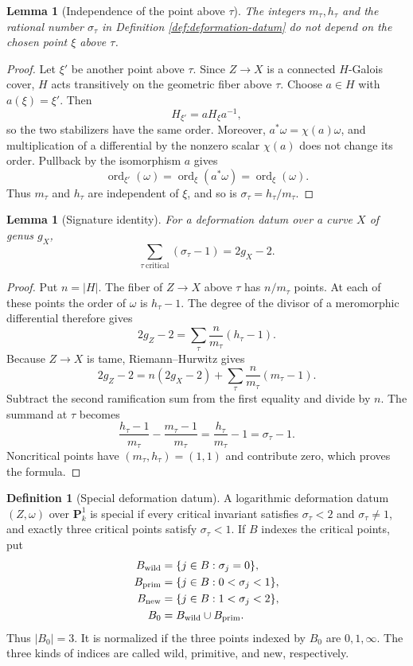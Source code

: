 \documentclass[11pt]{amsart}
\theoremstyle{plain}
\newtheorem{lemma}[theorem]{Lemma}
\theoremstyle{definition}
\newtheorem{definition}[theorem]{Definition}
\numberwithin{equation}{section}
\begin{document}
\begin{lemma}[Independence of the point above $\tau$]
\label{lem:deformation-invariants}
The integers $m_\tau,h_\tau$ and the rational number $\sigma_\tau$ in
Definition \ref{def:deformation-datum} do not depend on the chosen point
$\xi$ above $\tau$.
\end{lemma}

\begin{proof}
Let $\xi'$ be another point above $\tau$.  Since $Z\to X$ is a connected
$H$-Galois cover, $H$ acts transitively on the geometric fiber above
$\tau$.  Choose $a\in H$ with $a(\xi)=\xi'$.  Then
\[
 H_{\xi'}=aH_\xi a^{-1},
\]
so the two stabilizers have the same order.  Moreover,
$a^*\omega=\chi(a)\omega$, and multiplication of a differential by the
nonzero scalar $\chi(a)$ does not change its order.  Pullback by the
isomorphism $a$ gives
\[
 \operatorname{ord}_{\xi'}(\omega)
 =\operatorname{ord}_{\xi}(a^*\omega)
 =\operatorname{ord}_{\xi}(\omega).
\]
Thus $m_\tau$ and $h_\tau$ are independent of $\xi$, and so is
$\sigma_\tau=h_\tau/m_\tau$.
\end{proof}

\begin{lemma}[Signature identity]\label{lem:signature-identity}
For a deformation datum over a curve $X$ of genus $g_X$,
\[
 \sum_{\tau\ \mathrm{critical}}(\sigma_\tau-1)=2g_X-2.
\]
\end{lemma}

\begin{proof}
Put $n=|H|$.  The fiber of $Z\to X$ above $\tau$ has $n/m_\tau$ points.
At each of these points the order of $\omega$ is $h_\tau-1$.  The degree of
the divisor of a meromorphic differential therefore gives
\[
 2g_Z-2=\sum_\tau\frac{n}{m_\tau}(h_\tau-1).
\]
Because $Z\to X$ is tame, Riemann--Hurwitz gives
\[
 2g_Z-2=n(2g_X-2)
 +\sum_\tau\frac{n}{m_\tau}(m_\tau-1).
\]
Subtract the second ramification sum from the first equality and divide by
$n$.  The summand at $\tau$ becomes
\[
 \frac{h_\tau-1}{m_\tau}-\frac{m_\tau-1}{m_\tau}
 =\frac{h_\tau}{m_\tau}-1=\sigma_\tau-1.
\]
Noncritical points have $(m_\tau,h_\tau)=(1,1)$ and contribute zero, which
proves the formula.
\end{proof}

\begin{definition}[Special deformation datum]\label{def:special-datum}
A logarithmic deformation datum $(Z,\omega)$ over $\mathbf P^1_k$ is
special if every critical invariant satisfies $\sigma_\tau<2$ and
$\sigma_\tau\ne1$, and exactly three critical points satisfy
$\sigma_\tau<1$.  If $B$ indexes the critical points, put
\[
 \begin{aligned}
 B_{\rm wild}&=\{j\in B:\sigma_j=0\},\\
 B_{\rm prim}&=\{j\in B:0<\sigma_j<1\},\\
 B_{\rm new}&=\{j\in B:1<\sigma_j<2\},\\
 B_0&=B_{\rm wild}\cup B_{\rm prim}.
 \end{aligned}
\]
Thus $|B_0|=3$.  It is normalized if the three points indexed by $B_0$ are
$0,1,\infty$.  The three kinds of indices are called wild, primitive, and
new, respectively.
\end{definition}
\end{document}

